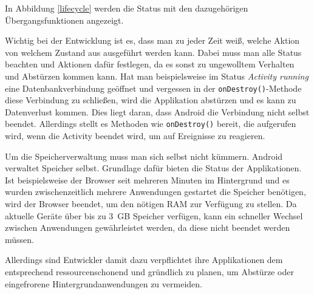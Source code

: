 In Abbildung \ref{lifecycle} werden die Status mit den dazugehörigen Übergangsfunktionen angezeigt.

Wichtig bei der Entwicklung ist es, dass man zu jeder Zeit weiß, welche Aktion von welchem Zustand aus ausgeführt werden kann. Dabei muss man alle Status beachten und Aktionen dafür festlegen, da es sonst zu ungewolltem Verhalten und Abstürzen kommen kann. Hat man beispielsweise im Status \emph{Activity running} eine Datenbankverbindung geöffnet und vergessen in der \verb+onDestroy()+-Methode diese Verbindung zu schließen, wird die Applikation abstürzen und es kann zu Datenverlust kommen. Dies liegt daran, dass Android die Verbindung nicht selbst beendet. Allerdings stellt es Methoden wie \verb+onDestroy()+ bereit, die aufgerufen wird, wenn die Activity beendet wird, um auf Ereignisse zu reagieren.

Um die Speicherverwaltung muss man sich selbst nicht kümmern. Android verwaltet Speicher selbst. Grundlage dafür bieten die Status der Applikationen. Ist beispielsweise der Browser seit mehreren Minuten im Hintergrund und es wurden zwischenzeitlich mehrere Anwendungen gestartet die Speicher benötigen, wird der Browser beendet, um den nötigen RAM zur Verfügung zu stellen. Da aktuelle Geräte über bis zu \SI{3}{GB} Speicher verfügen, kann ein schneller Wechsel zwischen Anwendungen gewährleistet werden, da diese nicht beendet werden müssen.

Allerdings sind Entwickler damit dazu verpflichtet ihre Applikationen dem entsprechend ressourcenschonend und gründlich zu planen, um Abstürze oder eingefrorene Hintergrundanwendungen zu vermeiden.